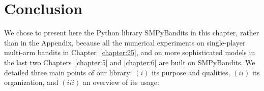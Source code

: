 \section{Conclusion}
\label{sec:3:conclusion}


We chose to present here the Python library SMPyBandits in this chapter, rather than in the Appendix, because all the numerical experiments on single-player multi-arm bandits in Chapter~\ref{chapter:25}, and on more sophisticated models in the last two Chapters~\ref{chapter:5} and \ref{chapter:6} are built on SMPyBandits.
%
We detailed three main points of our library:
$(i)$ its purpose and qualities,
$(ii)$ its organization,
and $(iii)$ an overview of its usage:
%

